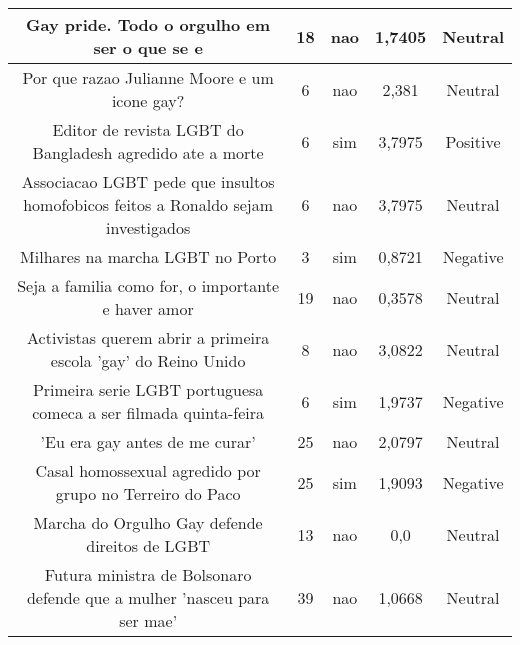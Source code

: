 \documentclass[11pt]{article}
\newlength\mylength
\begin{document}
\begin{center}
\begin{longtable}{||C{.40\mylength}||C{.20\mylength}||C{.20\mylength}||C{.30\mylength}||C{.20\mylength}||}
   Gay pride.  Todo o orgulho em ser o que se e  & 18 & nao & 1,7405 & Neutral \\  \hline
   Por que razao Julianne Moore e um icone gay?  & 6 & nao & 2,381 & Neutral \\  \hline
   Editor de revista LGBT do Bangladesh agredido ate a morte  & 6 & sim & 3,7975 & Positive \\  \hline
   Associacao LGBT pede que insultos homofobicos feitos a Ronaldo sejam investigados  & 6 & nao & 3,7975 & Neutral \\  \hline
   Milhares na marcha LGBT no Porto  & 3 & sim & 0,8721 & Negative \\  \hline
   Seja a familia como for, o importante e haver amor  & 19 & nao & 0,3578 & Neutral \\  \hline
   Activistas querem abrir a primeira escola 'gay' do Reino Unido  & 8 & nao & 3,0822 & Neutral \\  \hline
   Primeira serie LGBT portuguesa comeca a ser filmada quinta-feira  & 6 & sim & 1,9737 & Negative \\  \hline
   'Eu era gay antes de me curar'  & 25 & nao & 2,0797 & Neutral \\  \hline
   Casal homossexual agredido por grupo no Terreiro do Paco  & 25 & sim & 1,9093 & Negative \\  \hline
   Marcha do Orgulho Gay defende direitos de LGBT  & 13 & nao & 0,0 & Neutral \\  \hline
   Futura ministra de Bolsonaro defende que a mulher 'nasceu para ser mae'  & 39 & nao & 1,0668 & Neutral \\  \hline

\end{longtable}
\end{center}
\end{document}
